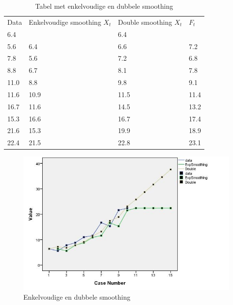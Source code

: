 \begin{table}
\centering
    \begin{tabular}{|llll|}
    \hline
    Data & Enkelvoudige smoothing $X_{t}$ & Double smoothing $X_{t}$ & $F_{t}$ \\
    6.4  & ~                      & 6.4              & ~                             \\
    5.6  & 6.4                    & 6.6              & 7.2                           \\
    7.8  & 5.6                    & 7.2              & 6.8                           \\
    8.8  & 6.7                    & 8.1              & 7.8                           \\
    11.0 & 8.8                    & 9.8              & 9.1                           \\
    11.6 & 10.9                   & 11.5             & 11.4                          \\
    16.7 & 11.6                   & 14.5             & 13.2                          \\
    15.3 & 16.6                   & 16.7             & 17.4                          \\
    21.6 & 15.3                   & 19.9             & 18.9                          \\
    22.4 & 21.5                   & 22.8             & 23.1                          \\ \hline
    \end{tabular}
		\caption{Tabel met enkelvoudige en dubbele smoothing}
		\label{tab:doubleSingle}
\end{table}

\begin{figure}
	\centering
		\includegraphics[width=1.00\textwidth]{images/tijdsreeksen/tijdsreeks71.jpg}
	\caption{Enkelvoudige en dubbele smoothing}
	\label{fig:tijdreeks71}
\end{figure}

